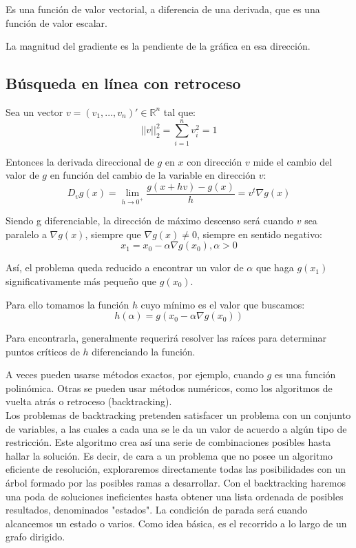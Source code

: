 Es una función de valor vectorial, a diferencia de una derivada, que es una función de valor escalar.

La magnitud del gradiente es la pendiente de la gráfica en esa dirección.

\subsection{Búsqueda en línea con retroceso}
Sea un vector $v = (v_1, ... , v_n)' \in \mathbb{R}^n$ tal que:
\[||v||_2^2 = \sum_{i=1}^{n} v_i^2 = 1\]

Entonces la derivada direccional de $g$ en $x$ con dirección $v$ mide el cambio del valor de $g$ en función del cambio de la variable en dirección $v$:
\[D_vg(x) = \lim\limits_{h \rightarrow 0^+}\frac{g(x+hv)-g(x)}{h} = v^t \nabla g(x)\]

Siendo g diferenciable, la dirección de máximo descenso será cuando $v$ sea paralelo a $\nabla g(x)$, siempre que $\nabla g(x) \neq 0$, siempre en sentido negativo:
\[x_{1} = x_{0} - \alpha \nabla g(x_{0}), \alpha > 0\]

Así, el problema queda reducido a encontrar un valor de $\alpha$ que haga $g(x_{1})$ significativamente más pequeño que $g(x_{0})$. 

Para ello tomamos la función $h$ cuyo mínimo es el valor que buscamos:
\[ h(\alpha) = g( x_{0}-\alpha \nabla g(x_{0}) ) \]

Para encontrarla, generalmente requerirá resolver las raíces para determinar puntos críticos de $h$ diferenciando la función.

A veces pueden usarse métodos exactos, por ejemplo, cuando $g$ es una función polinómica. Otras se pueden usar métodos numéricos, como los algoritmos de vuelta atrás o retroceso (backtracking).\\

Los problemas de backtracking pretenden satisfacer un problema con un conjunto de variables, a las cuales a cada una se le da un valor de acuerdo a algún tipo de restricción. Este algoritmo crea así una serie de combinaciones posibles hasta hallar la solución. Es decir, de cara a un problema que no posee un algoritmo eficiente de resolución, exploraremos directamente todas las posibilidades con un árbol formado por las posibles ramas a desarrollar. Con el backtracking haremos una poda de soluciones ineficientes hasta obtener una lista ordenada de posibles resultados, denominados "estados". La condición de parada será cuando alcancemos un estado o varios. Como idea básica, es el recorrido a lo largo de un grafo dirigido.

